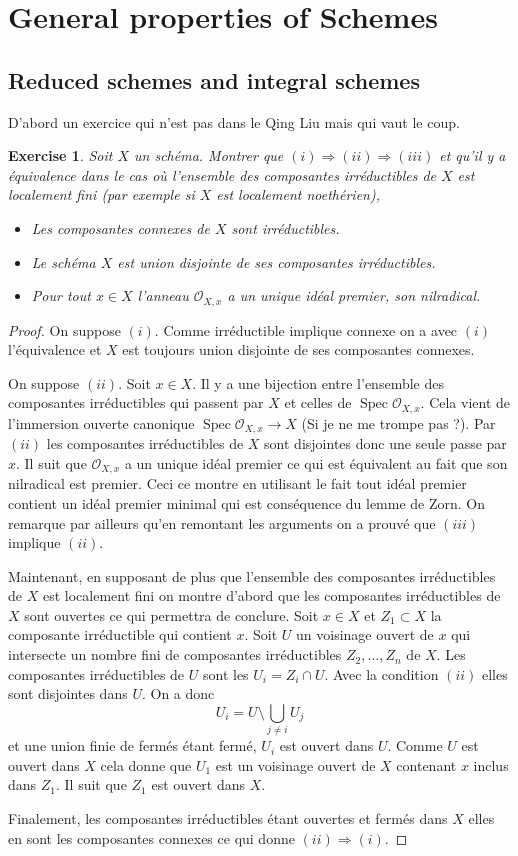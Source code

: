 \documentclass[A4, 11pt]{article}
\newtheorem{exer}{Exercise}
\def\Spec{ \operatorname{Spec}}
\begin{document}
\section{General properties of Schemes}
\subsection{Reduced schemes and integral schemes}
D'abord un exercice qui n'est pas dans le Qing Liu mais qui vaut le coup.
\begin{exer} Soit $X$ un schéma. Montrer que $(i)\Rightarrow (ii)\Rightarrow (iii)$ et qu'il y a équivalence dans le cas où l'ensemble des composantes irréductibles de $X$ est localement fini (par exemple si $X$ est localement noethérien),
\begin{itemize}
\item[(i)] Les composantes connexes de $X$ sont irréductibles.
\item[(ii)] Le schéma $X$ est union disjointe de ses composantes irréductibles.
\item[(iii)] Pour tout $x\in X$ l'anneau $\mathcal{O}_{X,x}$ a un unique idéal premier, son nilradical.
\end{itemize}
\end{exer}
\begin{proof}
On suppose $(i)$. Comme irréductible implique connexe on a avec $(i)$ l'équivalence et $X$ est toujours union disjointe de ses composantes connexes. 

On suppose $(ii)$. Soit $x\in X$. Il y a une bijection entre l'ensemble des composantes irréductibles qui passent par $X$ et celles de $\Spec \mathcal{O}_{X,x}$. Cela vient de l'immersion ouverte canonique $\Spec \mathcal{O}_{X,x} \rightarrow X$ (Si je ne me trompe pas ?). Par $(ii)$ les composantes irréductibles de $X$ sont disjointes donc une seule passe par $x$. Il suit que $\mathcal{O}_{X,x}$ a un unique idéal premier ce qui est équivalent au fait que son nilradical est premier. Ceci ce montre en utilisant le fait tout idéal premier contient un idéal premier minimal qui est conséquence du lemme de Zorn. On remarque par ailleurs qu'en remontant les arguments on a prouvé que $(iii)$ implique $(ii)$.

Maintenant, en supposant de plus que l'ensemble des composantes irréductibles de $X$ est localement fini on montre d'abord que les composantes irréductibles de $X$ sont ouvertes ce qui permettra de conclure. Soit $x\in X$ et $Z_1\subset X$ la composante irréductible qui contient $x$. Soit $U$ un voisinage ouvert de $x$ qui intersecte un nombre fini de composantes irréductibles $Z_2,\dots, Z_n$ de $X$. Les composantes irréductibles de $U$ sont les $U_i=Z_i\cap U$. Avec la condition $(ii)$ elles sont disjointes dans $U$. On a donc
$$U_i=U\setminus \bigcup\limits_{j\neq i} U_j$$
et une union finie de fermés étant fermé, $U_i$ est ouvert dans $U$. Comme $U$ est ouvert dans $X$ cela donne que $U_1$ est un voisinage ouvert de $X$ contenant $x$ inclus dans $Z_1$. Il suit que $Z_1$ est ouvert dans $X$. 

Finalement, les composantes irréductibles étant ouvertes et fermés dans $X$ elles en sont les composantes connexes ce qui donne $(ii)\Rightarrow (i)$. 
\end{proof}
\end{document}
